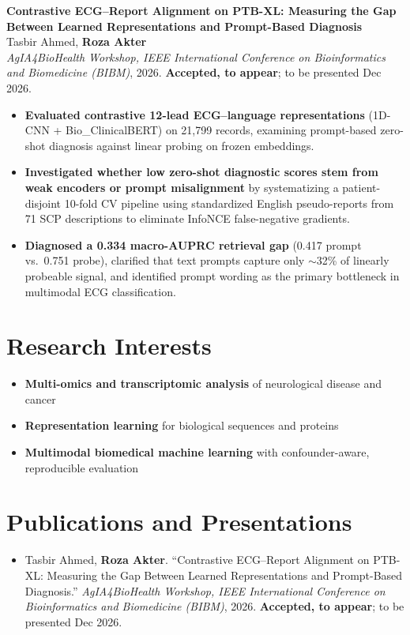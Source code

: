 \documentclass[10pt,letterpaper]{article}
\begin{document}
\vspace{3pt}\textbf{Contrastive ECG--Report Alignment on PTB-XL: Measuring the Gap Between Learned Representations and Prompt-Based Diagnosis}\\
Tasbir Ahmed, \textbf{Roza Akter}\\
\textit{AgIA4BioHealth Workshop, IEEE International Conference on Bioinformatics and Biomedicine (BIBM)}, 2026. \textbf{Accepted, to appear}; to be presented Dec 2026.\par
\begin{itemize}
  \item \textbf{Evaluated contrastive 12-lead ECG--language representations} (1D-CNN + Bio\_ClinicalBERT) on 21,799 records, examining prompt-based zero-shot diagnosis against linear probing on frozen embeddings.
  \item \textbf{Investigated whether low zero-shot diagnostic scores stem from weak encoders or prompt misalignment} by systematizing a patient-disjoint 10-fold CV pipeline using standardized English pseudo-reports from 71 SCP descriptions to eliminate InfoNCE false-negative gradients.
  \item \textbf{Diagnosed a 0.334 macro-AUPRC retrieval gap} (0.417 prompt vs.\ 0.751 probe), clarified that text prompts capture only $\sim$32\% of linearly probeable signal, and identified prompt wording as the primary bottleneck in multimodal ECG classification.
\end{itemize}

\section{Research Interests}
\begin{itemize}
  \item \textbf{Multi-omics and transcriptomic analysis} of neurological disease and cancer
  \item \textbf{Representation learning} for biological sequences and proteins
  \item \textbf{Multimodal biomedical machine learning} with confounder-aware, reproducible evaluation
\end{itemize}

\section{Publications and Presentations}
\begin{itemize}
  \item Tasbir Ahmed, \textbf{Roza Akter}. ``Contrastive ECG--Report Alignment on PTB-XL: Measuring the Gap Between Learned Representations and Prompt-Based Diagnosis.'' \textit{AgIA4BioHealth Workshop, IEEE International Conference on Bioinformatics and Biomedicine (BIBM)}, 2026. \textbf{Accepted, to appear}; to be presented Dec 2026.
\end{itemize}
\end{document}
